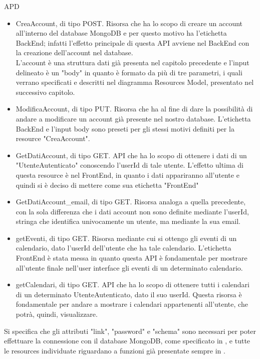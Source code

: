 \begin{listaPersonale} {APD}
\begin{listaPersonale2}[APD]{}
\begin{itemize}
                  \begin{itemize}
                      \item CreaAccount, di tipo POST. Risorsa che ha lo scopo di creare un account all'interno del database MongoDB e per questo motivo ha l'etichetta BackEnd; infatti l'effetto principale di questa API avviene nel BackEnd con la creazione dell'account nel database.\\ L'account è una struttura dati già presenta nel capitolo precedente e l'input delineato è un "body" in quanto è formato da più di tre parametri, i quali verrano specificati e descritti nel diagramma Resources Model, presentato nel successivo capitolo.
                      \item ModificaAccount, di tipo PUT. Risorsa che ha al fine di dare la possibilità di andare a modificare un account già presente nel nostro database. L'etichetta BackEnd e l'input body sono preseti per gli stessi motivi definiti per la resource "CreaAccount".
                      \item GetDatiAccount, di tipo GET. API che ha lo scopo di ottenere i dati di un "UtenteAutenticato" conoscendo l'userId di tale utente. L'effetto ultima di questa resource è nel FrontEnd, in quanto i dati appariranno all'utente e quindi si è deciso di mettere come sua etichetta "FrontEnd"
                      \item GetDatiAccount\_email, di tipo GET. Risorsa analoga a quella precedente, con la sola differenza che i dati account non sono definite mediante l'userId, stringa che identifica univocamente un utente, ma mediante la sua email.
                      \item getEventi, di tipo GET. Risorsa mediante cui si ottengo gli eventi di un calendario, dato l'userId dell'utente che ha tale calendario. L'etichetta FrontEnd è stata messa in quanto questa API è fondamentale per mostrare all'utente finale nell'user interface gli eventi di un determinato calendario.
                      \item getCalendari, di tipo GET. API che ha lo scopo di ottenere tutti i calendari di un determinato UtenteAutenticato, dato il suo userId. Questa risorsa è fondamentale per andare a mostrare i calendari appartenenti all'utente, che potrà, quindi, visualizzare.
                  \end{itemize}
                  Si specifica che gli attributi "link", "password" e "schema" sono necessari per poter effettuare la connessione con il database MongoDB, come specificato in , e tutte le resources individuate riguardano a funzioni già presentate sempre in .

\end{itemize}
\end{listaPersonale2}
\end{listaPersonale}
